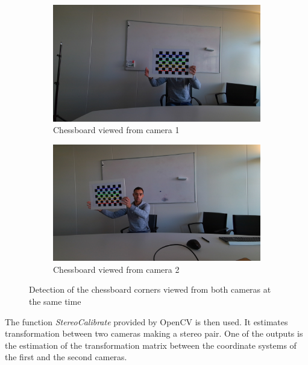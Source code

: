 \begin{figure}[H]
\centering
  \begin{subfigure}[b]{0.48 \textwidth}
    \includegraphics[width=\textwidth]{images/registration/corner_sub_4.jpg}
    \caption{Chessboard viewed from camera 1}
    \label{figure:corner_sub_4}
  \end{subfigure}
  \hfill
  \begin{subfigure}[b]{0.48\textwidth}
    \includegraphics[width=\textwidth]{images/registration/corner_master_4.jpg}
    \caption{Chessboard viewed from camera 2}
    \label{figure:corner_master_4}
  \end{subfigure}
  \caption{Detection of the chessboard corners viewed from both cameras at the same time}
  \label{figure:corner}
\end{figure}

The function \textit{StereoCalibrate} provided by OpenCV is then used. It estimates transformation between two cameras making a stereo pair. One of the outputs is the estimation of the transformation matrix between the coordinate systems of the first and the second cameras.


